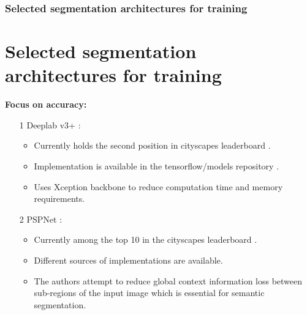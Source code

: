 \documentclass{beamer}
\begin{document}
\begin{frame}
	\frametitle{Selected segmentation architectures for training}
	\section{Selected segmentation architectures for training}
		\textbf{Focus on accuracy:}
		\vspace{3mm}
		\begin{itemize}
			\item[1] Deeplab v3+ \cite{deeplabv3plus2018}:
				\begin{itemize}
					\item Currently holds the second position in cityscapes leaderboard \cite{cityscapes_leaderboard}.
					\vspace{2mm}
					\item Implementation is available in the tensorflow/models repository \cite{tf_models_deeplab}.
					\vspace{2mm}
					\item Uses Xception backbone to reduce computation time and memory requirements.
				\end{itemize}
			\vspace{3mm}
			\item[2] PSPNet \cite{DBLP:journals/corr/ZhaoSQWJ16}:
				\begin{itemize}
					\item Currently among the top 10 in the cityscapes leaderboard \cite{cityscapes_leaderboard}.
					\vspace{2mm}
					\item Different sources of implementations are available.
					\vspace{2mm}
					\item The authors attempt to reduce global context information loss between sub-regions of the input image which is essential for semantic segmentation.
				\end{itemize}
		\end{itemize}
\end{frame}
\end{document}
